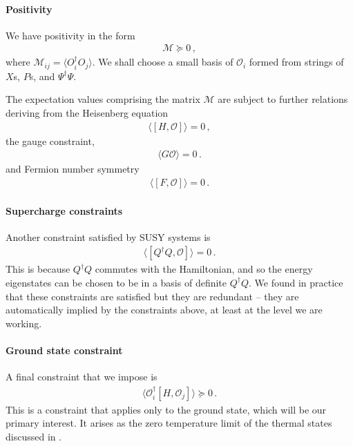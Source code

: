 \documentclass[a4paper,11pt]{article}
\newcommand{\M}{{\mathcal M}}
\numberwithin{equation}{section}
\begin{document}

\paragraph{Positivity}

We have positivity in the form
\begin{align}
    \M \succeq 0 \, ,
\end{align}
%
where $\M_{ij} = \langle O^\dagger_i O_j \rangle$. We shall choose a small basis of $\mathcal{O}_i$ formed from strings of $X$s, $P$s, and $\Psi^\dagger \Psi$.

The expectation values comprising the matrix $\M$ are subject to further relations deriving from the Heisenberg equation
%
\begin{align}
    \langle [H, \mathcal{O}] \rangle = 0 \,,
\end{align}
%
the gauge constraint,
%
\begin{align}
    \langle G \mathcal{O} \rangle = 0 \, .
\end{align}
%
and Fermion number symmetry
%
\begin{align}
    \langle [F, \mathcal{O}] \rangle = 0\,.
\end{align}

\paragraph{Supercharge constraints}

Another constraint satisfied by SUSY systems is 
%
\begin{align}
    \langle [Q^\dagger Q , \mathcal O] \rangle = 0 \, .
\end{align}
%
This is because $Q^\dagger Q$ commutes with the Hamiltonian, and so the energy eigenstates can be chosen to be in a basis of definite $Q^\dagger Q$. We found in practice that these constraints are satisfied but they are redundant -- they are automatically implied by the constraints above, at least at the level we are working.

\paragraph{Ground state constraint}

A final constraint that we impose is 
%
\begin{align}
    \langle \mathcal O_i^\dagger [H, \mathcal O_j] \rangle \succeq 0 \, .
\end{align}
%
This is a constraint that applies only to the ground state, which will be our primary interest. It arises as the zero temperature limit of the thermal states discussed in \cite{Fawzi:2023fpg, Cho:2024kxn}.
\end{document}
